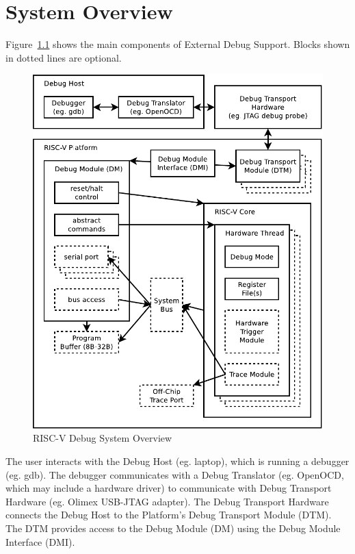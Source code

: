 \chapter{System Overview} \label{overview}

Figure~\ref{fig:overview} shows the main components of External Debug Support.
Blocks shown in dotted lines are optional. 

\begin{figure}
   \centering
   \includegraphics[width=\textwidth]{fig/overview-eps-converted-to.pdf}
   \caption{RISC-V Debug System Overview}
   \label{fig:overview}
\end{figure}

The user interacts with the Debug Host (eg. laptop), which is running a
debugger (eg. gdb).  The debugger communicates with a Debug Translator (eg.
OpenOCD, which may include a hardware driver) to communicate with Debug
Transport Hardware (eg.  Olimex USB-JTAG adapter).
The Debug Transport Hardware connects the Debug Host to the Platform's Debug
Transport Module (DTM).  The DTM provides access to the Debug Module (DM) using
the Debug Module Interface (DMI).

